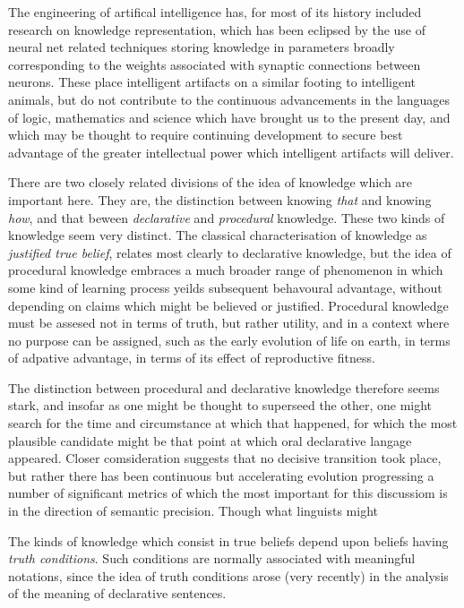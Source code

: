 The engineering of artifical intelligence has, for most of its history included research on knowledge representation, which has been eclipsed by the use of neural net related techniques storing knowledge in parameters broadly corresponding to the weights associated with synaptic connections between neurons.
These place intelligent artifacts on a similar footing to intelligent animals, but do not contribute to the continuous advancements in the languages of logic, mathematics and science which have brought us to the present day, and which may be thought to require continuing development to secure best advantage of the greater intellectual power which intelligent artifacts will deliver.

There are two closely related divisions of the idea of knowledge which are important here.
They are, the distinction between knowing \emph{that} and knowing \emph{how}, and that beween \emph{declarative} and \emph{procedural} knowledge.
These two kinds of knowledge seem very distinct.
The classical characterisation of knowledge as \emph{justified true belief}, relates most clearly to declarative knowledge, but the idea of procedural knowledge embraces a much broader range of phenomenon in which some kind of learning process yeilds subsequent behavoural advantage, without depending on claims which might be believed or justified.
Procedural knowledge must be assesed not in terms of truth, but rather utility, and in a context where no purpose can be assigned, such as the early evolution of life on earth, in terms of adpative advantage, in terms of its effect of reproductive fitness.

The distinction between procedural and declarative knowledge therefore seems stark, and insofar as one might be thought to superseed the other, one might search for the time and circumstance at which that happened, for which the most plausible candidate might be that point at which oral declarative langage appeared.
Closer comsideration suggests that no decisive transition took place, but rather there has been continuous but accelerating evolution progressing a number of significant metrics of which the most important for this discussiom is in the direction of semantic precision.
Though what linguists might 





The kinds of knowledge which consist in true beliefs depend upon beliefs having \emph{truth conditions}.
Such conditions are normally associated with meaningful notations, since the idea of truth conditions arose (very recently) in the analysis of the meaning of declarative sentences.

